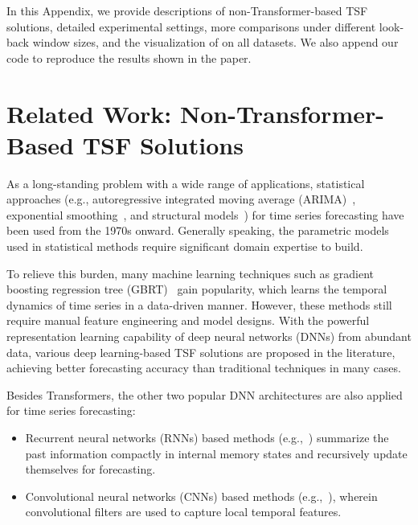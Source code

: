 


%
In this Appendix, we provide descriptions of non-Transformer-based TSF solutions, detailed experimental settings, more comparisons under different look-back window sizes, and the visualization of \modelname on all datasets. We also append our code to reproduce the results shown in the paper.



\appendix


\section{Related Work: Non-Transformer-Based TSF Solutions}
\label{sec:related_non}
As a long-standing problem with a wide range of applications, statistical approaches (e.g., autoregressive integrated moving average (ARIMA)~\cite{ariyo2014arima}, exponential smoothing~\cite{gardner1985exponential}, and structural models~\cite{harvey1990forecasting}) for time series forecasting have been used from the 1970s onward.
%
Generally speaking, the parametric models used in statistical methods require significant domain expertise to build. 

To relieve this burden, many machine learning techniques such as gradient boosting regression tree (GBRT)~\cite{gbrt,elsayed2021we} 
gain popularity, which learns the temporal dynamics of time series in a data-driven manner. 
%
However, these methods still require manual feature engineering and model designs.
%
With the powerful representation learning capability of deep neural networks (DNNs) from abundant data, various deep learning-based TSF solutions are proposed in the literature, achieving better forecasting accuracy than traditional techniques in many cases. 

Besides Transformers, the other two popular DNN architectures are also applied for time series forecasting: 

\begin{itemize}
    \item Recurrent neural networks (RNNs) based methods (e.g.,~\cite{petnehazi2019recurrent}) summarize the past information compactly in internal memory states and recursively update themselves for forecasting. 
    \item Convolutional neural networks (CNNs) based methods (e.g.,~\cite{bai2018empirical}), wherein convolutional filters are used to capture local temporal features.
\end{itemize}

